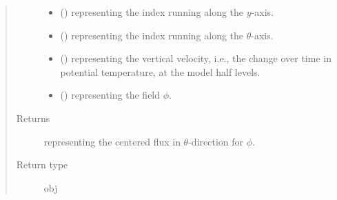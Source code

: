 \documentclass[letterpaper,10pt,english]{sphinxmanual}
\begin{document}
\begin{fulllineitems}
\begin{fulllineitems}
\begin{quote}
\begin{description}
\begin{itemize}
\item {} 
 () \textendash{}  representing the index running along the \(y\)-axis.

\item {} 
 () \textendash{}  representing the index running along the \(\theta\)-axis.

\item {} 
 () \textendash{}  representing the vertical velocity, i.e., the change over time in
potential temperature, at the model half levels.

\item {} 
 () \textendash{}  representing the field \(\phi\).

\end{itemize}

\item[{Returns}] \leavevmode
{} representing the centered flux in \(\theta\)-direction for \(\phi\).

\item[{Return type}] \leavevmode
obj

\end{description}\end{quote}

\end{fulllineitems}


\end{fulllineitems}

\end{document}
